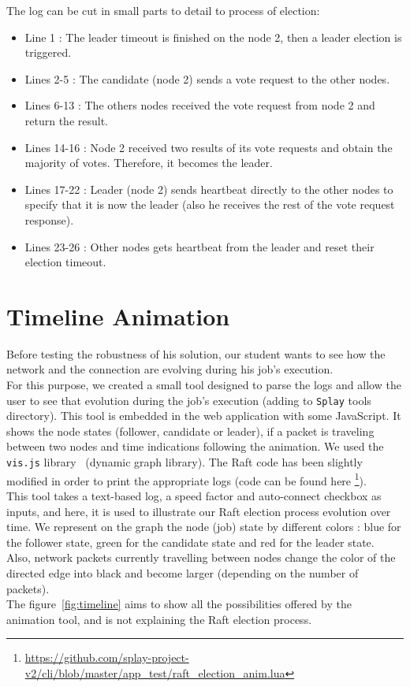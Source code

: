 \documentclass{eplmastersthesis}
\begin{document}
        The log can be cut in small parts to detail to process of election:
        \begin{itemize}
          \item Line 1 : The leader timeout is finished on the node 2, then a leader election is triggered.
          \item Lines 2-5 : The candidate (node 2) sends a vote request to the other nodes.
          \item Lines 6-13 : The others nodes received the vote request from node 2 and return the result.
          \item Lines 14-16 : Node 2 received two results of its vote requests and obtain the majority of votes.
          Therefore, it becomes the leader.
          \item Lines 17-22 : Leader (node 2) sends heartbeat directly to the other nodes to specify that it is now the leader
          (also he receives the rest of the vote request response).
          \item Lines 23-26 : Other nodes gets heartbeat from the leader and reset their election timeout.
        \end{itemize}

    \section{Timeline Animation}

      Before testing the robustness of his solution, our student wants to
      see how the network and the connection are evolving during his job's
      execution.\\
      For this purpose, we created a small tool designed to parse the
      logs and allow the user to see that evolution during the job's
      execution (adding to \texttt{Splay} tools directory).
      This tool is embedded in the web application with some
      JavaScript. It shows the node states (follower, candidate or leader),
      if a packet is traveling between two nodes and time
      indications following the animation. We used the \texttt{vis.js} library~\cite{VisJS}
      (dynamic graph library). The Raft code has been slightly
      modified in order to print the appropriate logs (code can be found here
      \footnote{\url{https://github.com/splay-project-v2/cli/blob/master/app_test/raft_election_anim.lua}}).\\

      This tool takes a text-based log, a speed factor and auto-connect
      checkbox as inputs, and here, it is used to illustrate our Raft election
      process evolution over time. We represent on the graph the node (job)
      state by different colors : blue for the follower state,
      green for the candidate state and red for the leader state.\\
      Also, network packets currently travelling between nodes change the color
      of the directed edge into black and become larger (depending on the
      number of packets).\\
      The figure~\ref{fig:timeline} aims to show all the possibilities offered by the animation
      tool, and is not explaining the Raft election process.
\end{document}
